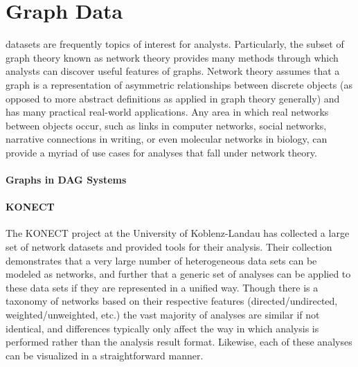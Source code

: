 \section{Graph Data}
\label{sec:graph_data}
 datasets are frequently topics of interest for analysts. Particularly, the subset of graph theory known as network theory provides many methods through which analysts can discover useful features of graphs. Network theory assumes that a graph is a representation of asymmetric relationships between discrete objects (as opposed to more abstract definitions as applied in graph theory generally) and has many practical real-world applications. Any area in which real networks between objects occur, such as links in computer networks, social networks, narrative connections in writing,  or even molecular networks in biology, can provide a myriad of use cases for analyses that fall under network theory. 

\paragraph{Graphs in DAG Systems}

\paragraph{KONECT}
The KONECT project \citep{Kunegis2013} at the University of Koblenz-Landau has collected a large set of network datasets and provided tools for their analysis. Their collection demonstrates that a very large number of heterogeneous data sets can be modeled as networks, and further that a generic set of analyses can be applied to these data sets if they are represented in a unified way. Though there is a taxonomy of networks based on their respective features (directed/undirected, weighted/unweighted, etc.) the vast majority of analyses are similar if not identical, and differences typically only affect the way in which analysis is performed rather than the analysis result format. Likewise, each of these analyses can be visualized in a straightforward manner.

